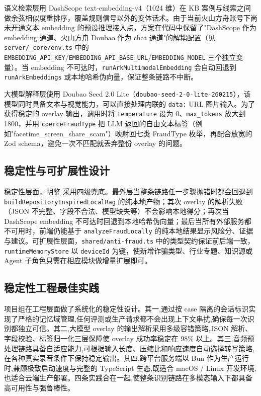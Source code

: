 \documentclass[UTF8,a4paper,12pt]{ctexart}
\begin{document}
语义检索层用 DashScope text-embedding-v4（1024 维）在 KB 案例与线索之间做余弦相似度重排序，覆盖规则信号以外的变体话术。由于当前火山方舟账号下尚未开通文本 embedding 的预设推理接入点，方案在代码中保留了"DashScope 作为 embedding 通道、火山方舟 Doubao 作为 chat 通道"的解耦配置（见 \texttt{server/\_core/env.ts} 中的 \texttt{EMBEDDING\_API\_KEY}/\texttt{EMBEDDING\_API\_BASE\_URL}/\texttt{EMBEDDING\_MODEL} 三个独立变量）。当 embedding 不可达时，\texttt{runArkMultimodalEmbedding} 会自动回退到 \texttt{runArkEmbeddings} 或本地哈希伪向量，保证整条链路不中断。

大模型解释层使用 Doubao Seed 2.0 Lite（\texttt{doubao-seed-2-0-lite-260215}），该模型同时具备文本与视觉能力，可以直接处理内联的 \texttt{data:} URL 图片输入。为了获得稳定的 overlay 输出，调用时将 \texttt{temperature} 设为 0、\texttt{max\_tokens} 放大到 1800，并用 \texttt{coerceFraudType} 把 LLM 返回的自由文本标签（例如"facetime\_screen\_share\_scam"）映射回七类 FraudType 枚举，再配合放宽的 Zod schema，避免一次不匹配就丢弃整份 overlay 的问题。

\subsection{稳定性与可扩展性设计}

稳定性层面，明鉴 采用四级兜底。最外层当整条链路任一步骤抛错时都会回退到 \texttt{buildRepositoryInspiredLocalRag} 的纯本地产物；其次 overlay 的解析失败（JSON 不完整、字段不合法、模型缺失等）不会影响本地得分；再次当 DashScope embedding 不可达时回退到本地哈希伪向量；最后当所有外部服务都不可用时，前端仍能基于 \texttt{analyzeFraudLocally} 的纯本地结果显示风险分、证据与建议。可扩展性层面，\texttt{shared/anti-fraud.ts} 中的类型契约保证前后端一致，\texttt{runtimeMemoryStore} 以 \texttt{deviceId} 为键，使新增诈骗类型、行业专题、知识源或 Agent 子角色只需在相应模块做增量扩展即可。

\subsection{稳定性工程最佳实践}

项目组在工程层面做了系统化的稳定性设计。其一,通过按 case 隔离的会话标识实现了严格的记忆域管理,任何评测或生产请求都不会出现上下文串扰,确保每一次识别都独立可信。其二,大模型 overlay 的输出解析采用多级容错策略,JSON 解析、字段校验、标签归一化三层保障使 overlay 成功率稳定在 98\% 以上。其三,音频预处理链路具备自适应能力,可根据输入长度、压缩比和响应速度自动选择转写策略,在各种真实录音条件下保持稳定输出。其四,跨平台服务端以 Bun 作为生产运行时,兼顾极致启动速度与完整的 TypeScript 生态,既适合 macOS / Linux 开发环境,也适合云端生产部署。四条实践合在一起,使整条识别链路在多模态输入下都具备高可用性与强鲁棒性。
\end{document}
